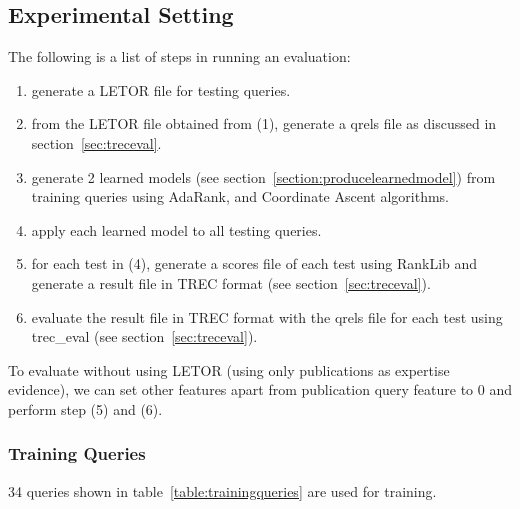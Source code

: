 \subsection{Experimental Setting}
 The following is a list of steps in running an evaluation:
\begin{enumerate}
 \item generate a LETOR file for testing queries.
 \item from the LETOR file obtained from (1), generate a qrels file as discussed in section~\ref{sec:treceval}.
 \item generate 2 learned models (see section~\ref{section:producelearnedmodel}) from training queries using AdaRank, and Coordinate Ascent algorithms.
 \item apply each learned model to all testing queries.
 \item for each test in (4), generate a scores file of each test using RankLib and generate a result file in TREC format (see section~\ref{sec:treceval}).
 \item evaluate the result file in TREC format with the qrels file for each test using trec\_eval (see section~\ref{sec:treceval}).
\end{enumerate}

To evaluate without using LETOR (using only publications as expertise evidence), we can set other features apart from publication query feature to 0
and perform step (5) and (6).

\subsubsection{Training Queries}
34 queries shown in table~\ref{table:trainingqueries} are used for training. 

